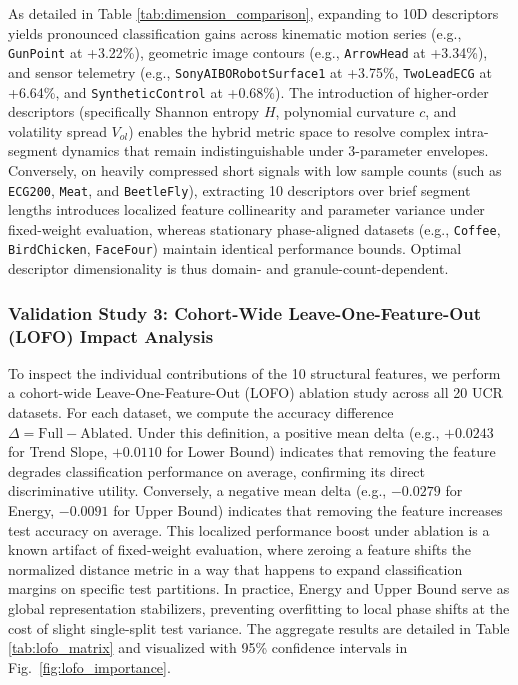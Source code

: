 \documentclass[conference]{IEEEtran}
\begin{document}
As detailed in Table \ref{tab:dimension_comparison}, expanding to 10D descriptors yields pronounced classification gains across kinematic motion series (e.g., \texttt{GunPoint} at +3.22\%), geometric image contours (e.g., \texttt{ArrowHead} at +3.34\%), and sensor telemetry (e.g., \texttt{SonyAIBORobotSurface1} at +3.75\%, \texttt{TwoLeadECG} at +6.64\%, and \texttt{SyntheticControl} at +0.68\%). The introduction of higher-order descriptors (specifically Shannon entropy $H$, polynomial curvature $c$, and volatility spread $V_{ol}$) enables the hybrid metric space to resolve complex intra-segment dynamics that remain indistinguishable under 3-parameter envelopes. Conversely, on heavily compressed short signals with low sample counts (such as \texttt{ECG200}, \texttt{Meat}, and \texttt{BeetleFly}), extracting 10 descriptors over brief segment lengths introduces localized feature collinearity and parameter variance under fixed-weight evaluation, whereas stationary phase-aligned datasets (e.g., \texttt{Coffee}, \texttt{BirdChicken}, \texttt{FaceFour}) maintain identical performance bounds. Optimal descriptor dimensionality is thus domain- and granule-count-dependent.

\subsubsection{Validation Study 3: Cohort-Wide Leave-One-Feature-Out (LOFO) Impact Analysis}
To inspect the individual contributions of the 10 structural features, we perform a cohort-wide Leave-One-Feature-Out (LOFO) ablation study across all 20 UCR datasets. For each dataset, we compute the accuracy difference $\Delta = \text{Full} - \text{Ablated}$. Under this definition, a positive mean delta (e.g., $+0.0243$ for Trend Slope, $+0.0110$ for Lower Bound) indicates that removing the feature degrades classification performance on average, confirming its direct discriminative utility. Conversely, a negative mean delta (e.g., $-0.0279$ for Energy, $-0.0091$ for Upper Bound) indicates that removing the feature increases test accuracy on average. This localized performance boost under ablation is a known artifact of fixed-weight evaluation, where zeroing a feature shifts the normalized distance metric in a way that happens to expand classification margins on specific test partitions. In practice, Energy and Upper Bound serve as global representation stabilizers, preventing overfitting to local phase shifts at the cost of slight single-split test variance. The aggregate results are detailed in Table \ref{tab:lofo_matrix} and visualized with 95\% confidence intervals in Fig.~\ref{fig:lofo_importance}.
\end{document}
